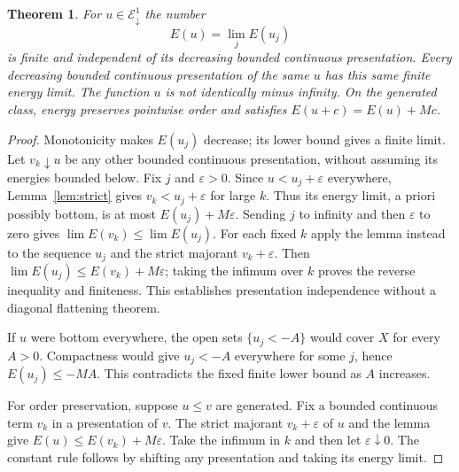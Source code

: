 \documentclass[11pt]{article}
\newtheorem{theorem}{Theorem}
\begin{document}
\begin{theorem}\label{thm:canonical}
For $u\in\mathcal E^1_{\downarrow}$ the number
\[
                         E(u)=\lim_j E(u_j)
\]
is finite and independent of its decreasing bounded continuous
presentation. Every decreasing bounded continuous presentation of the
same $u$ has this same finite energy limit. The function $u$ is not
identically minus infinity. On the generated class, energy preserves
pointwise order and satisfies $E(u+c)=E(u)+Mc$.
\end{theorem}
\begin{proof}
Monotonicity makes $E(u_j)$ decrease; its lower bound gives a finite
limit. Let $v_k\downarrow u$ be any other bounded continuous
presentation, without assuming its energies bounded below. Fix $j$
and $\varepsilon>0$. Since $u<u_j+\varepsilon$ everywhere,
Lemma~\ref{lem:strict} gives $v_k<u_j+\varepsilon$ for large $k$.
Thus its energy limit, a priori possibly bottom, is at most
$E(u_j)+M\varepsilon$. Sending $j$ to infinity and then
$\varepsilon$ to zero gives $\lim E(v_k)\leq\lim E(u_j)$.
For each fixed $k$ apply the lemma instead to the sequence $u_j$
and the strict majorant $v_k+\varepsilon$.
Then $\lim E(u_j)\leq E(v_k)+M\varepsilon$; taking the infimum
over $k$ proves the reverse inequality and finiteness. This establishes
presentation independence without a diagonal flattening theorem.

If $u$ were bottom everywhere, the open sets $\{u_j<-A\}$ would
cover $X$ for every $A>0$. Compactness would give $u_j<-A$
everywhere for some $j$, hence $E(u_j)\leq-MA$. This contradicts
the fixed finite lower bound as $A$ increases.

For order preservation, suppose $u\leq v$ are generated. Fix a
bounded continuous term $v_k$ in a presentation of $v$. The strict
majorant $v_k+\varepsilon$ of $u$ and the lemma give
$E(u)\leq E(v_k)+M\varepsilon$. Take the infimum in $k$ and then
let $\varepsilon\downarrow0$. The constant rule follows by shifting
any presentation and taking its energy limit.
\end{proof}
\end{document}
